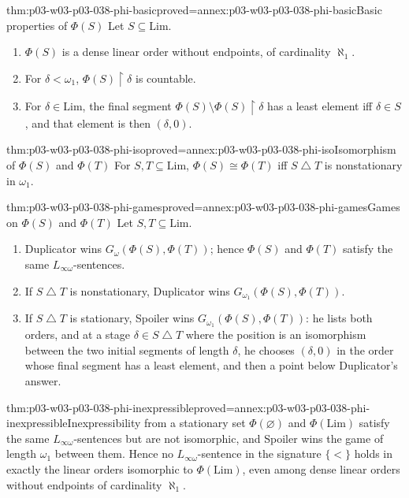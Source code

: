 \begin{hblemma}{thm:p03-w03-p03-038-phi-basic}{proved=annex:p03-w03-p03-038-phi-basic}{Basic properties of \(\Phi(S)\)}
Let \(S\subseteq\mathrm{Lim}\).
\begin{enumerate}
\item \(\Phi(S)\) is a dense linear order without endpoints, of
      cardinality \(\aleph_1\).
\item For \(\delta<\omega_1\), \(\Phi(S)\mathbin{\upharpoonright}\delta\)
      is countable.
\item For \(\delta\in\mathrm{Lim}\), the final segment
      \(\Phi(S)\setminus\Phi(S)\mathbin{\upharpoonright}\delta\) has a least
      element iff \(\delta\in S\), and that element is then \((\delta,0)\).
\end{enumerate}
\end{hblemma}

\begin{hbtheorem}{thm:p03-w03-p03-038-phi-iso}{proved=annex:p03-w03-p03-038-phi-iso}{Isomorphism of \(\Phi(S)\) and \(\Phi(T)\)}
For \(S,T\subseteq\mathrm{Lim}\),
\(\Phi(S)\cong\Phi(T)\) iff \(S\mathbin{\triangle}T\) is nonstationary in
\(\omega_1\).
\end{hbtheorem}

\begin{hbtheorem}{thm:p03-w03-p03-038-phi-games}{proved=annex:p03-w03-p03-038-phi-games}{Games on \(\Phi(S)\) and \(\Phi(T)\)}
Let \(S,T\subseteq\mathrm{Lim}\).
\begin{enumerate}
\item Duplicator wins \(G_\omega(\Phi(S),\Phi(T))\); hence \(\Phi(S)\) and
      \(\Phi(T)\) satisfy the same \(L_{\infty\omega}\)-sentences.
\item If \(S\mathbin{\triangle}T\) is nonstationary, Duplicator wins
      \(G_{\omega_1}(\Phi(S),\Phi(T))\).
\item If \(S\mathbin{\triangle}T\) is stationary, Spoiler wins
      \(G_{\omega_1}(\Phi(S),\Phi(T))\): he lists both orders, and at a stage
      \(\delta\in S\mathbin{\triangle}T\) where the position is an
      isomorphism between the two initial segments of length \(\delta\),
      he chooses \((\delta,0)\) in the order whose final segment has a least
      element, and then a point below Duplicator's answer.
\end{enumerate}
\end{hbtheorem}

\begin{hbcorollary}{thm:p03-w03-p03-038-phi-inexpressible}{proved=annex:p03-w03-p03-038-phi-inexpressible}{Inexpressibility from a stationary set}
\(\Phi(\varnothing)\) and \(\Phi(\mathrm{Lim})\) satisfy the same
\(L_{\infty\omega}\)-sentences but are not isomorphic, and Spoiler wins the
game of length \(\omega_1\) between them. Hence no
\(L_{\infty\omega}\)-sentence in the signature \(\{<\}\) holds in exactly
the linear orders isomorphic to \(\Phi(\mathrm{Lim})\), even among dense
linear orders without endpoints of cardinality \(\aleph_1\).
\end{hbcorollary}

